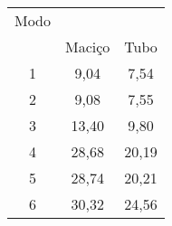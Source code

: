     \begin{tabular}{c c c}
        \hline Modo &  &  \\
         & Maciço & Tubo \\
        \hline        
		1 & 9,04 & 7,54 \\
		2 & 9,08 & 7,55 \\
		3 & 13,40 & 9,80 \\
		4 & 28,68 & 20,19\\
		5 & 28,74 & 20,21 \\
		6 & 30,32 & 24,56 \\
		\hline
    \end{tabular}
